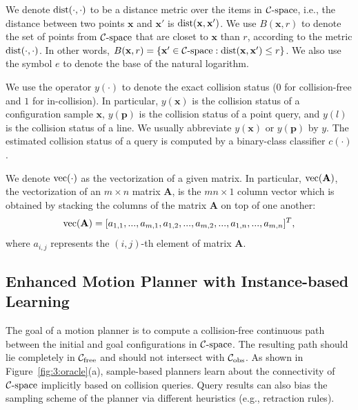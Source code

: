 We denote $\operatorname{dist}(\cdot, \cdot)$ to be a distance metric over the items in $\mathcal C\text{-space}$, i.e., the distance between two points $\mathbf x$ and $\mathbf x'$ is $\operatorname{dist}(\mathbf x, \mathbf x')$. We use $B(\mathbf x, r)$ to denote the set of points from $\mathcal C\text{-space}$ that are closet to $\mathbf x$ than $r$, according to the metric $\operatorname{dist}(\cdot, \cdot)$. In other words, $B(\mathbf x, r) = \{\mathbf x' \in \mathcal C\text{-space}: \operatorname{dist}(\mathbf x, \mathbf x') \leq r\}$. We also use the symbol $e$ to denote the base of the natural logarithm.

We use the operator $y(\cdot)$ to denote the exact collision status ($0$ for collision-free and $1$ for in-collision). In particular, $y(\mathbf x)$ is the collision status of a configuration sample $\mathbf x$, $y(\mathbf p)$ is the collision status of a point query, and $y(l)$ is the collision status of a line. We usually abbreviate $y(\mathbf x)$ or $y(\mathbf p)$ by $y$. The estimated collision status of a query is computed by a binary-class classifier $c(\cdot)$.

We denote $\operatorname{vec}(\cdot)$ as the vectorization of a given matrix. In particular, $\operatorname{vec}(\mathbf A)$, the vectorization of an $m\times n$ matrix $\mathbf A$, is the $m n \times 1$ column vector which is obtained by stacking the columns of the matrix $\mathbf A$ on top of one another:
\begin{equation}
  \operatorname{vec}(\mathbf A) = [a_{1,1}, ..., a_{m,1}, a_{1,2}, ..., a_{m,2}, ..., a_{1,n}, ..., a_{m,n}]^T, \notag
\end{equation}
where $a_{i,j}$ represents the $(i,j)$-th element of matrix $\mathbf A$.


\subsection{Enhanced Motion Planner with Instance-based Learning}
The goal of a motion planner is to compute a collision-free continuous path between the initial and goal configurations in $\mathcal C\text{-space}$. The resulting path should lie completely in $\mathcal C_{\text{free}}$ and should not intersect with $\mathcal C_{\text{obs}}$. As shown in Figure~\ref{fig:3:oracle}(a), sample-based planners learn about the connectivity of $\mathcal C\text{-space}$ implicitly based on collision queries. Query results can also bias the sampling scheme of the planner via different heuristics (e.g., retraction rules).

